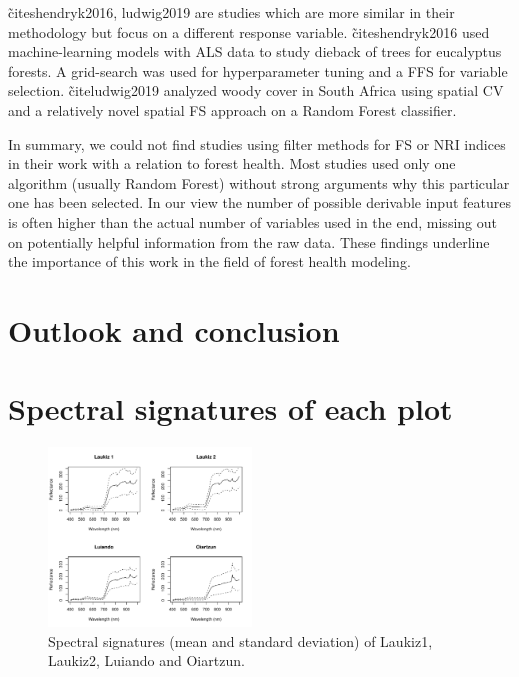 \documentclass[letterpaper, peerreview]{IEEEtran}
\begin{document}
\~cite{shendryk2016, ludwig2019} are studies which are more similar in their methodology but focus on a different response variable.
\~cite{shendryk2016} used machine-learning models with \ac{ALS} data to study dieback of trees for eucalyptus forests.
A grid-search was used for hyperparameter tuning and a \ac{FFS} for variable selection.
\~cite{ludwig2019} analyzed woody cover in South Africa using spatial \ac{CV} and a relatively novel spatial \ac{FS} approach\cite{meyer2018} on a Random Forest classifier.

In summary, we could not find studies using filter methods for \ac{FS} or \ac{NRI} indices in their work with a relation to forest health.
Most studies used only one algorithm (usually Random Forest) without strong arguments why this particular one has been selected.
In our view the number of possible derivable input features is often higher than the actual number of variables used in the end, missing out on potentially helpful information from the raw data.
These findings underline the importance of this work in the field of forest health modeling.

\section{Outlook and conclusion}

\appendices{}

\section{Spectral signatures of each plot}

\begin{figure} [ht]
	\begin{center}
		\includegraphics[width=0.48\textwidth] {spectral-signatures-1.pdf}
		\caption{Spectral signatures (mean and standard deviation) of Laukiz1, Laukiz2, Luiando and Oiartzun.}\label{fig:spectral-signatures}
	\end{center}
\end{figure}
\end{document}
